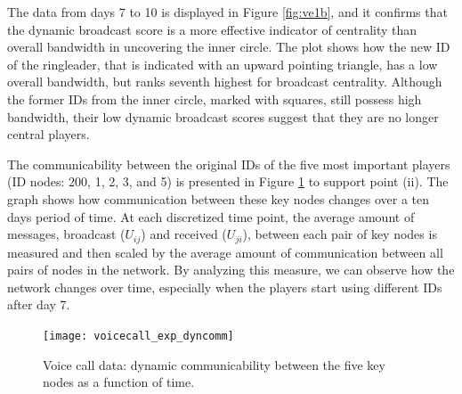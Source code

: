 
The data from days 7 to 10 is displayed in Figure \ref{fig:ve1b}, and it confirms that the dynamic broadcast score is a more effective indicator of centrality than overall bandwidth in uncovering the inner circle.  The plot shows how the new ID of the ringleader, that is indicated with an upward pointing triangle, has a low overall bandwidth, but ranks seventh highest for broadcast centrality. Although the former IDs from the inner circle, marked with squares, still possess high bandwidth, their low dynamic broadcast scores suggest that they are no longer central players.


\newpage

The communicability between the original IDs of the five most important players (ID nodes: 200, 1, 2, 3, and 5) is presented in Figure \ref{fig:ve2} to support point (ii). The graph shows how communication between these key nodes changes over a ten days period of time. At each discretized time point, the average amount of messages, broadcast ($U_{ij}$) and received ($U_{ji}$), between each pair of key nodes is measured and then scaled by the average amount of communication between all pairs of nodes in the network. By analyzing this measure, we can observe how the network changes over time, especially when the players start using different IDs after day 7.


\begin{figure}[h]\centering
    \texttt{[image: voicecall\_exp\_dyncomm]}
    \caption{Voice call data: dynamic communicability between the five key nodes as a function of time.}
    \label{fig:ve2}
    \bigskip
\end{figure}


